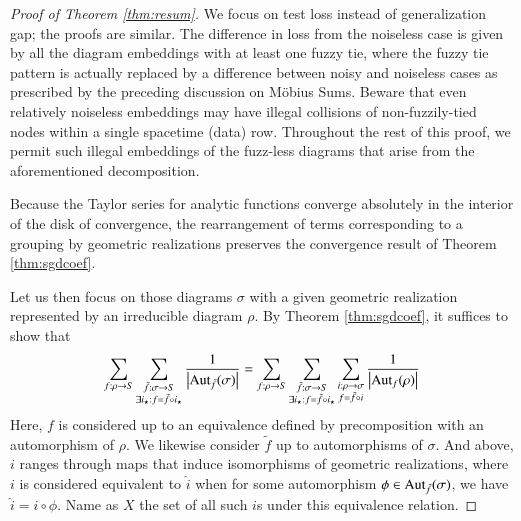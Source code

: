 \documentclass{article}
\theoremstyle{plain}
\theoremstyle{definition}
\newcommand{\wabs}[1]{\left|#1\right|}
\newcommand{\Aut}{\text{\textnormal{Aut}}}
\begin{document}
        \begin{proof}[Proof of Theorem \ref{thm:resum}]
            We focus on test loss instead of generalization gap; the proofs are
            similar. The difference in loss from the noiseless case is given by
            all the diagram embeddings with at least one fuzzy tie, where the
            fuzzy tie pattern is actually replaced by a difference between
            noisy and noiseless cases as prescribed by the preceding discussion
            on M\"obius Sums.  Beware that even relatively noiseless embeddings
            may have illegal collisions of non-fuzzily-tied nodes within a
            single spacetime (data) row.  Throughout the rest of this proof, we
            permit such illegal embeddings of the fuzz-less diagrams that arise
            from the aforementioned decomposition.  

            Because the Taylor series for analytic functions converge
            absolutely in the interior of the disk of convergence, the
            rearrangement of terms corresponding to a grouping by geometric
            realizations preserves the convergence result of Theorem
            \ref{thm:sgdcoef}.  

            Let us then focus on those diagrams $\sigma$ with a given geometric
            realization represented by an irreducible diagram $\rho$.  By
            Theorem \ref{thm:sgdcoef}, it suffices to show that
            \begin{equation} \label{eq:hard}
                \sum_{f:\rho\to S}
                \sum_{\substack{
                    \tilde f:\sigma\to S \\
                    \exists i_\star: f=\tilde f \circ i_\star
                }}
                \frac{1}{\wabs{\Aut_{\tilde f}(\sigma)}}
                =
                \sum_{f:\rho\to S}
                \sum_{\substack{
                    \tilde f:\sigma\to S \\
                    \exists i_\star: f=\tilde f \circ i_\star
                }}
                \sum_{\substack{
                    i:\rho\to\sigma \\
                    f = \tilde f \circ i
                }}
                \frac{1}{\wabs{\Aut_{f}(\rho)}}
            \end{equation}
            Here, $f$ is considered up to an equivalence defined by
            precomposition with an automorphism of $\rho$.  We likewise
            consider $\tilde f$ up to automorphisms of $\sigma$.  And above,
            $i$ ranges through maps that induce isomorphisms of geometric
            realizations, where $i$ is considered equivalent to $\hat i$ when
            for some automorphism $\phi \in \Aut_{\tilde f}(\sigma)$, we have
            $\hat i = i \circ \phi$.  Name as $X$ the set of all such $i$s
            under this equivalence relation.


\end{proof}
\end{document}
